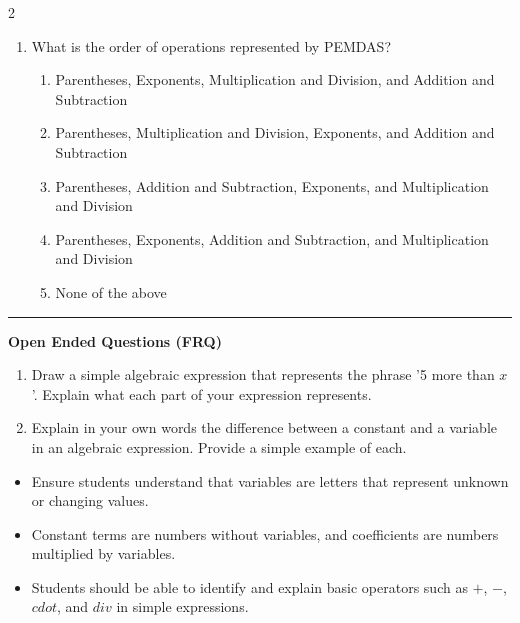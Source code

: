\documentclass[10pt]{article}
\begin{document}
\begin{multicols}{2}
\begin{enumerate}[label=\textbf{Q\arabic*.}, leftmargin=*, itemsep=6pt, parsep=0pt]
  \item \small What is the order of operations represented by PEMDAS?
  \begin{enumerate}[label=(\Alph*), leftmargin=0.6cm, nosep, itemsep=2pt]
    \item Parentheses, Exponents, Multiplication and Division, and Addition and Subtraction
    \item Parentheses, Multiplication and Division, Exponents, and Addition and Subtraction
    \item Parentheses, Addition and Subtraction, Exponents, and Multiplication and Division
    \item Parentheses, Exponents, Addition and Subtraction, and Multiplication and Division
    \item None of the above
  \end{enumerate}

\end{enumerate}
\end{multicols}

\vspace{-0.2cm}
\hrule
\vspace{0.2cm}
\textbf{\small Open Ended Questions (FRQ)}
\begin{enumerate}[label=\textbf{Q\arabic*.}, start=9, itemsep=5pt, topsep=0pt]

  \item \small Draw a simple algebraic expression that represents the phrase '5 more than $x$'. Explain what each part of your expression represents. \vspace{1.2000000000000002cm}

  \item \small Explain in your own words the difference between a constant and a variable in an algebraic expression. Provide a simple example of each. \vspace{1.2000000000000002cm}

\end{enumerate}

\vfill

\begin{tcolorbox}[colback=blue!5, colframe=mainblue!50, title=\small \textbf{Chef's Tips}, fonttitle=\bfseries, bottom=1mm]
\begin{itemize}[noitemsep, topsep=2pt, leftmargin=0.5cm]
  \item \scriptsize Ensure students understand that variables are letters that represent unknown or changing values.\item \scriptsize Constant terms are numbers without variables, and coefficients are numbers multiplied by variables.\item \scriptsize Students should be able to identify and explain basic operators such as $+$, $-$, $cdot$, and $div$ in simple expressions.
\end{itemize}
\end{tcolorbox}
\end{document}
